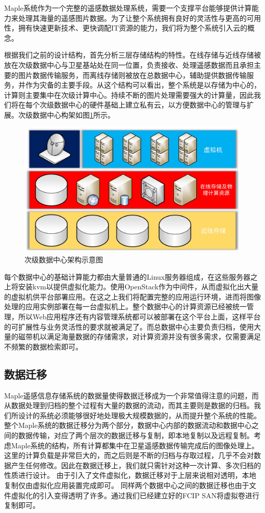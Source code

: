 \documentclass{article}
\begin{document}
Maple系统作为一个完整的遥感数据处理系统，需要一个支撑平台能够提供计算能力来处理其海量的遥感图片数据。为了让整个系统拥有良好的灵活性与更高的可用性，拥有快速更新技术、更快调配IT资源的能力，我们将为整个系统引入云的概念。

根据我们之前的设计结构，首先分析三层存储结构的特性。在线存储与近线存储被放在次级数据中心与卫星基站处在同一位置，负责接收、处理遥感数据而且承担主要的图片数据传输服务，而离线存储则被放在总数据中心，辅助提供数据传输服务，并作为灾备的主要手段。从这个结构可以看出，整个系统是以存储为中心的，计算则主要集中在次级计算中心。持续不断的图片处理需要强大的计算量，因此我们将在每个次级数据中心的硬件基础上建立私有云，以方便数据中心的管理与扩展。次级数据中心构架如图\ref{sub}所示。

\begin{figure}[H]
\centering 
\includegraphics[width=\textwidth]{sub.jpg}
\caption{次级数据中心架构示意图}
\label{sub}
\end{figure}

每个数据中心的基础计算能力都由大量普通的Linux服务器组成，在这些服务器之上将安装kvm以提供虚拟化能力。使用OpenStack作为中间件，从而虚拟化出大量的虚拟机供平台部署应用。在这之上我们将配置完整的应用运行环境，进而将图像处理的应用实例部署在每一台虚拟机上。整个数据中心的计算资源已经被统一管理，所以Web应用程序还有内容管理系统都可以被部署在这个平台上面，这样平台的可扩展性与业务灵活性的要求就被满足了。而总数据中心主要负责归档，使用大量的磁带机以满足海量数据的存储需求，对计算资源并没有很多需求，仅需要满足不频繁的数据检索即可。

\subsection{数据迁移}
Maple遥感信息存储系统的数据量使得数据迁移成为一个非常值得注意的问题，而从数据处理到归档的整个过程有大量的数据的流动，而其主要则是数据的归档。我们所设计的系统必须能够很好地处理极大规模数据的，从而提升整个系统的性能。整个Maple系统的数据迁移分为两个部分，数据中心内部的数据流动和数据中心之间的数据传输，对应了两个层次的数据迁移与复制，即本地复制以及远程复制。考虑Maple系统的结构，所有计算都集中在卫星遥感数据传输完成后的图像处理上。这里的计算负载是非常巨大的，而之后则是不断的归档与存取过程，几乎不会对数据产生任何修改。因此在数据迁移上，我们就只需针对这种一次计算、多次归档的性质进行设计。
由于引入了文件虚拟化，数据迁移对于上层来说相对透明，本地复制仅由虚拟化应用装置完成即可。
同样两个数据中心之间的数据迁移也由于文件虚拟化的引入变得透明了许多。通过我们已经建立好的FCIP SAN将虚拟卷进行复制即可。
\end{document}
